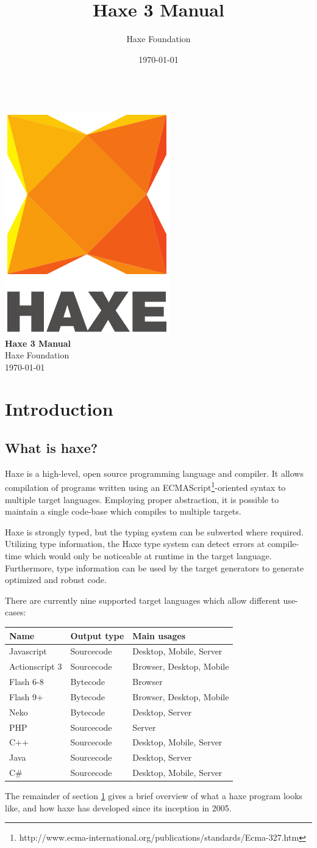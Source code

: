 \documentclass{article}
\renewcommand{\maketitle}{
   \begin{titlepage}
     \setcounter{page}{-1}
			\begin{center}
				~\\[3cm]
				\includegraphics[scale=1.25]{assets/logo.pdf}~\\[1cm]
				{\huge \bfseries Haxe 3 Manual}\\[7cm]
				Haxe Foundation\\
				\today
			\end{center}
   \end{titlepage}
}
\begin{document}
\title{Haxe 3 Manual}
\author{Haxe Foundation}
\date{\today}
\maketitle


\clearpage
\todototoc
\listoftodos
\clearpage

\clearpage
\tableofcontents
\clearpage

\section{Introduction}
\label{Introduction}

\subsection{What is haxe?}

Haxe is a high-level, open source programming language and compiler. It allows compilation of programs written using an ECMAScript\footnote{http://www.ecma-international.org/publications/standards/Ecma-327.htm}-oriented syntax to multiple target languages. Employing proper abstraction, it is possible to maintain a single code-base which compiles to multiple targets.

Haxe is strongly typed, but the typing system can be subverted where required. Utilizing type information, the Haxe type system can detect errors at compile-time which would only be noticeable at runtime in the target language. Furthermore, type information can be used by the target generators to generate optimized and robust code.

There are currently nine supported target languages which allow different use-cases:

\begin{center}
\begin{tabular}{| l | l | l |}
	\hline
	Name & Output type & Main usages \\ \hline
	Javascript & Sourcecode & Desktop, Mobile, Server \\
	Actionscript 3 & Sourcecode & Browser, Desktop, Mobile \\
	Flash 6-8 & Bytecode & Browser \\
	Flash 9+ & Bytecode & Browser, Desktop, Mobile \\ 
	Neko & Bytecode & Desktop, Server \\
	PHP & Sourcecode & Server \\
	C++ & Sourcecode & Desktop, Mobile, Server \\
	Java & Sourcecode & Desktop, Server \\
	C\# & Sourcecode & Desktop, Mobile, Server \\ \hline
\end{tabular}
\end{center}
The remainder of section \ref{Introduction} gives a brief overview of what a haxe program looks like, and how haxe has developed since its inception in 2005.
\end{document}
